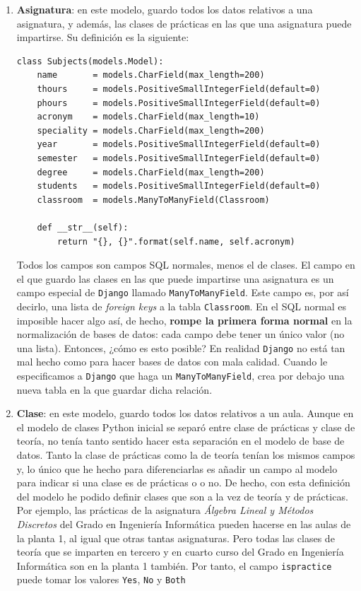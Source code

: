 \begin{enumerate}[---]
    \item \textbf{Asignatura}: en este modelo, guardo todos los datos relativos a una asignatura, y además, las clases de prácticas en las que una asignatura puede impartirse. Su definición es la siguiente:

\begin{verbatim}
class Subjects(models.Model):
    name       = models.CharField(max_length=200)
    thours     = models.PositiveSmallIntegerField(default=0)
    phours     = models.PositiveSmallIntegerField(default=0)
    acronym    = models.CharField(max_length=10)
    speciality = models.CharField(max_length=200)
    year       = models.PositiveSmallIntegerField(default=0)
    semester   = models.PositiveSmallIntegerField(default=0)
    degree     = models.CharField(max_length=200)
    students   = models.PositiveSmallIntegerField(default=0)
    classroom  = models.ManyToManyField(Classroom)

    def __str__(self):
        return "{}, {}".format(self.name, self.acronym)
\end{verbatim}

Todos los campos son campos SQL normales, menos el de clases. El campo en el que guardo las clases en las que puede impartirse una asignatura es un campo especial de \texttt{Django} llamado \texttt{ManyToManyField}. Este campo es, por así decirlo, una lista de \textit{foreign keys} a la tabla \texttt{Classroom}. En el SQL normal es imposible hacer algo así, de hecho, \textbf{rompe la primera forma normal} en la normalización de bases de datos: cada campo debe tener un único valor (no una lista). Entonces, ¿cómo es esto posible? En realidad \texttt{Django} no está tan mal hecho como para hacer bases de datos con mala calidad. Cuando le especificamos a \texttt{Django} que haga un \texttt{ManyToManyField}, crea por debajo una nueva tabla en la que guardar dicha relación.

    \item \textbf{Clase}: en este modelo, guardo todos los datos relativos a un aula. Aunque en el modelo de clases Python inicial se separó entre clase de prácticas y clase de teoría, no tenía tanto sentido hacer esta separación en el modelo de base de datos. Tanto la clase de prácticas como la de teoría tenían los mismos campos y, lo único que he hecho para diferenciarlas es añadir un campo al modelo para indicar si una clase es de prácticas o o no. De hecho, con esta definición del modelo he podido definir clases que son a la vez de teoría y de prácticas. Por ejemplo, las prácticas de la asignatura \textit{Álgebra Lineal y Métodos Discretos} del Grado en Ingeniería Informática pueden hacerse en las aulas de la planta 1, al igual que otras tantas asignaturas. Pero todas las clases de teoría que se imparten en tercero y en cuarto curso del Grado en Ingeniería Informática son en la planta 1 también. Por tanto, el campo \texttt{ispractice} puede tomar los valores \texttt{Yes}, \texttt{No} y \texttt{Both}


\end{enumerate}
